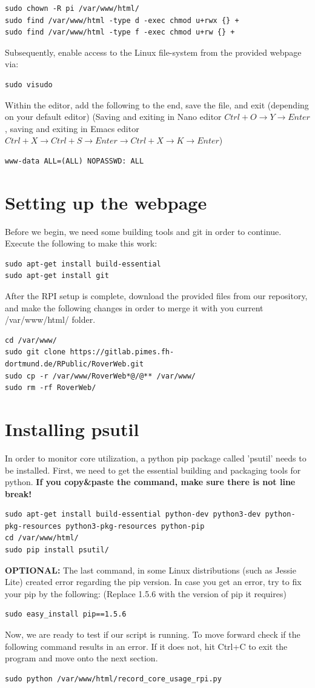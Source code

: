 \begin{lstlisting}
sudo chown -R pi /var/www/html/
sudo find /var/www/html -type d -exec chmod u+rwx {} +
sudo find /var/www/html -type f -exec chmod u+rw {} +
\end{lstlisting}
Subsequently, enable access to the Linux file-system from the provided webpage via:
\begin{lstlisting}
sudo visudo
\end{lstlisting}
Within the editor, add the following to the end, save the file, and exit (depending on your default editor)
(Saving and exiting in Nano editor $Ctrl+O \rightarrow Y \rightarrow Enter$, saving and exiting in Emacs editor $Ctrl + X \rightarrow Ctrl + S \rightarrow Enter \rightarrow Ctrl + X \rightarrow K \rightarrow Enter$) 
\begin{lstlisting}
www-data ALL=(ALL) NOPASSWD: ALL
\end{lstlisting}
\section{Setting up the webpage}
Before we begin, we need some building tools and git in order to continue. Execute the following to make this work:\textit{}
\begin{lstlisting}
sudo apt-get install build-essential
sudo apt-get install git
\end{lstlisting}
After the RPI setup is complete, download the provided files from our repository, and make the following changes in order to merge it with you current /var/www/html/ folder. 
\begin{lstlisting}
cd /var/www/
sudo git clone https://gitlab.pimes.fh-dortmund.de/RPublic/RoverWeb.git
sudo cp -r /var/www/RoverWeb*@/@** /var/www/
sudo rm -rf RoverWeb/
\end{lstlisting}
\section{Installing psutil}
In order to monitor core utilization, a python pip package called 'psutil' needs to be installed. First, we need to get the essential building and packaging tools for python. \textbf{If you copy\&paste the command, make sure there is not line break!}
\begin{lstlisting}
sudo apt-get install build-essential python-dev python3-dev python-pkg-resources python3-pkg-resources python-pip
cd /var/www/html/
sudo pip install psutil/
\end{lstlisting}
\textbf{OPTIONAL:} The last command, in some Linux distributions (such as Jessie Lite) created error regarding the pip version. In case you get an error, try to fix your pip by the following: (Replace 1.5.6 with the version of pip it requires) 
\begin{lstlisting}
sudo easy_install pip==1.5.6
\end{lstlisting}
Now, we are ready to test if our script is running. To move forward check if the following command results in an error. If it does not, hit Ctrl+C to exit the program and move onto the next section.
\begin{lstlisting}
sudo python /var/www/html/record_core_usage_rpi.py
\end{lstlisting}
